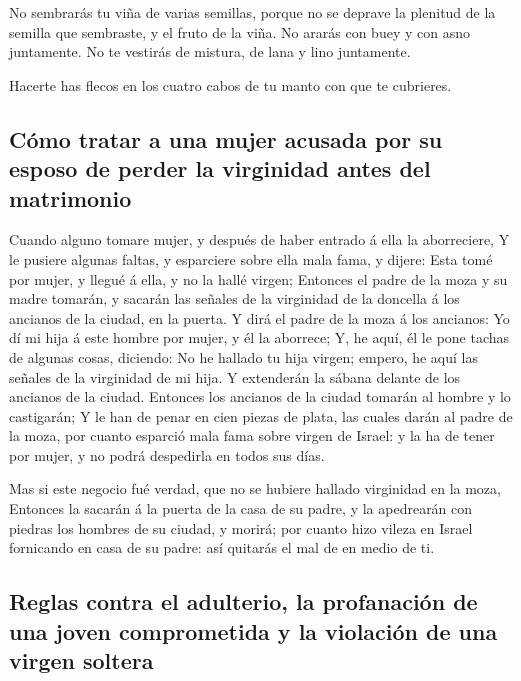  No sembrarás tu viña de varias semillas, porque no se
deprave la plenitud de la semilla que sembraste, y el fruto de la viña.
 No ararás con buey y con asno juntamente.  No
te vestirás de mistura, de lana y lino juntamente.

 Hacerte has flecos en los cuatro cabos de tu manto con que
te cubrieres.

\hypertarget{cuxf3mo-tratar-a-una-mujer-acusada-por-su-esposo-de-perder-la-virginidad-antes-del-matrimonio}{%
\subsection{Cómo tratar a una mujer acusada por su esposo de perder la
virginidad antes del
matrimonio}\label{cuxf3mo-tratar-a-una-mujer-acusada-por-su-esposo-de-perder-la-virginidad-antes-del-matrimonio}}

 Cuando alguno tomare mujer, y después de haber entrado á
ella la aborreciere,  Y le pusiere algunas faltas, y
esparciere sobre ella mala fama, y dijere: Esta tomé por mujer, y llegué
á ella, y no la hallé virgen;  Entonces el padre de la moza
y su madre tomarán, y sacarán las señales de la virginidad de la
doncella á los ancianos de la ciudad, en la puerta.  Y dirá
el padre de la moza á los ancianos: Yo dí mi hija á este hombre por
mujer, y él la aborrece;  Y, he aquí, él le pone tachas de
algunas cosas, diciendo: No he hallado tu hija virgen; empero, he aquí
las señales de la virginidad de mi hija. Y extenderán la sábana delante
de los ancianos de la ciudad.  Entonces los ancianos de la
ciudad tomarán al hombre y lo castigarán;  Y le han de
penar en cien piezas de plata, las cuales darán al padre de la moza, por
cuanto esparció mala fama sobre virgen de Israel: y la ha de tener por
mujer, y no podrá despedirla en todos sus días.

 Mas si este negocio fué verdad, que no se hubiere hallado
virginidad en la moza,  Entonces la sacarán á la puerta de
la casa de su padre, y la apedrearán con piedras los hombres de su
ciudad, y morirá; por cuanto hizo vileza en Israel fornicando en casa de
su padre: así quitarás el mal de en medio de ti.

\hypertarget{reglas-contra-el-adulterio-la-profanaciuxf3n-de-una-joven-comprometida-y-la-violaciuxf3n-de-una-virgen-soltera}{%
\subsection{Reglas contra el adulterio, la profanación de una joven
comprometida y la violación de una virgen
soltera}\label{reglas-contra-el-adulterio-la-profanaciuxf3n-de-una-joven-comprometida-y-la-violaciuxf3n-de-una-virgen-soltera}}

